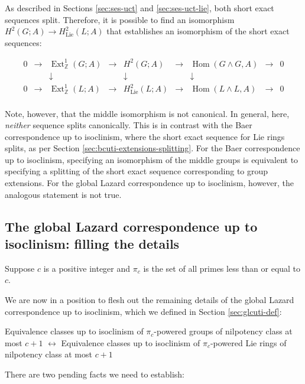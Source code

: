 \documentclass{ucetd}
\begin{document}
As described in Sections \ref{sec:ses-uct} and
\ref{sec:ses-uct-lie}, both short exact sequences
split. Therefore, it is possible to find an isomorphism $H^2(G;A) \to
H^2_{\text{Lie}}(L;A)$ that establishes an isomorphism of the short
exact sequences:

$$\begin{array}{ccccccccc}
  0 &\to &\operatorname{Ext}^1_{\mathbb{Z}}(G;A) &\to &H^2(G;A) &\to &\operatorname{Hom}(G \wedge G,A) &\to &0\\
  & & \downarrow & & \downarrow & & \downarrow & & \\
  0 &\to &\operatorname{Ext}^1_{\mathbb{Z}}(L;A) & \to & H^2_{\text{Lie}}(L;A) & \to & \operatorname{Hom}(L \wedge L, A) & \to & 0\\
\end{array}$$

Note, however, that the middle isomorphism is not canonical. In
general, here, {\em neither} sequence splits canonically. This is in
contrast with the Baer correspondence up to isoclinism, where the
short exact sequence for Lie rings splits, as per Section
\ref{sec:bcuti-extensions-splitting}. For the Baer correspondence up
to isoclinism, specifying an isomorphism of the middle groups is
equivalent to specifying a splitting of the short exact sequence
corresponding to group extensions. For the global Lazard
correspondence up to isoclinism, however, the analogous statement is
not true.

\subsection{The global Lazard correspondence up to isoclinism: filling the details}

Suppose $c$ is a positive integer and $\pi_c$ is the set of all primes
less than or equal to $c$.

We are now in a position to flesh out the remaining details of the
global Lazard correspondence up to isoclinism, which we defined in Section
\ref{sec:glcuti-def}:

\begin{center}
  Equivalence classes up to isoclinism of $\pi_c$-powered groups of
  nilpotency class at most $c + 1$ $\leftrightarrow$ Equivalence
  classes up to isoclinism of $\pi_c$-powered Lie rings of nilpotency
  class at most $c + 1$
\end{center}

There are two pending facts we need to establish:
\end{document}
